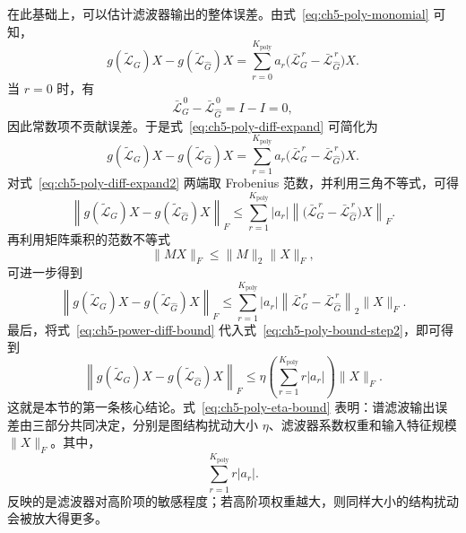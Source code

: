 在此基础上，可以估计滤波器输出的整体误差。由式~\eqref{eq:ch5-poly-monomial} 可知，
\begin{equation}
  g(\tilde{\mathcal{L}}_{G})X-g(\tilde{\mathcal{L}}_{\hat G})X
  =
  \sum_{r=0}^{K_{\text{poly}}}
  a_r\bigl(
  \bar{\mathcal{L}}_G^{\,r}-\bar{\mathcal{L}}_{\hat G}^{\,r}
  \bigr)X.
  \label{eq:ch5-poly-diff-expand}
\end{equation}
当 $r=0$ 时，有
\begin{equation}
  \bar{\mathcal{L}}_G^{\,0}-\bar{\mathcal{L}}_{\hat G}^{\,0}
  =
  I-I
  =
  0,
  \label{eq:ch5-zero-order-cancel}
\end{equation}
因此常数项不贡献误差。于是式~\eqref{eq:ch5-poly-diff-expand} 可简化为
\begin{equation}
  g(\tilde{\mathcal{L}}_{G})X-g(\tilde{\mathcal{L}}_{\hat G})X
  =
  \sum_{r=1}^{K_{\text{poly}}}
  a_r\bigl(
  \bar{\mathcal{L}}_G^{\,r}-\bar{\mathcal{L}}_{\hat G}^{\,r}
  \bigr)X.
  \label{eq:ch5-poly-diff-expand2}
\end{equation}
对式~\eqref{eq:ch5-poly-diff-expand2} 两端取 Frobenius 范数，并利用三角不等式，可得
\begin{equation}
  \left\|
  g(\tilde{\mathcal{L}}_{G})X-g(\tilde{\mathcal{L}}_{\hat G})X
  \right\|_F
  \le
  \sum_{r=1}^{K_{\text{poly}}}
  |a_r|
  \left\|
  \bigl(
  \bar{\mathcal{L}}_G^{\,r}-\bar{\mathcal{L}}_{\hat G}^{\,r}
  \bigr)X
  \right\|_F.
  \label{eq:ch5-poly-bound-step1}
\end{equation}
再利用矩阵乘积的范数不等式
\begin{equation}
  \|MX\|_F\le \|M\|_2\|X\|_F,
  \label{eq:ch5-frobenius-submult}
\end{equation}
可进一步得到
\begin{equation}
  \left\|
  g(\tilde{\mathcal{L}}_{G})X-g(\tilde{\mathcal{L}}_{\hat G})X
  \right\|_F
  \le
  \sum_{r=1}^{K_{\text{poly}}}
  |a_r|
  \left\|
  \bar{\mathcal{L}}_G^{\,r}-\bar{\mathcal{L}}_{\hat G}^{\,r}
  \right\|_2
  \|X\|_F.
  \label{eq:ch5-poly-bound-step2}
\end{equation}
最后，将式~\eqref{eq:ch5-power-diff-bound} 代入式~\eqref{eq:ch5-poly-bound-step2}，即可得到
\begin{equation}
  \left\|
  g(\tilde{\mathcal{L}}_{G})X-g(\tilde{\mathcal{L}}_{\hat G})X
  \right\|_F
  \le
  \eta
  \left(
  \sum_{r=1}^{K_{\text{poly}}} r|a_r|
  \right)\|X\|_F.
  \label{eq:ch5-poly-eta-bound}
\end{equation}
这就是本节的第一条核心结论。式~\eqref{eq:ch5-poly-eta-bound} 表明：谱滤波输出误差由三部分共同决定，分别是图结构扰动大小 $\eta$、滤波器系数权重和输入特征规模 $\|X\|_F$。其中，
\begin{equation}
  \sum_{r=1}^{K_{\text{poly}}} r|a_r|.
  \label{eq:ch5-poly-coeff-weight}
\end{equation}
反映的是滤波器对高阶项的敏感程度；若高阶项权重越大，则同样大小的结构扰动会被放大得更多。

